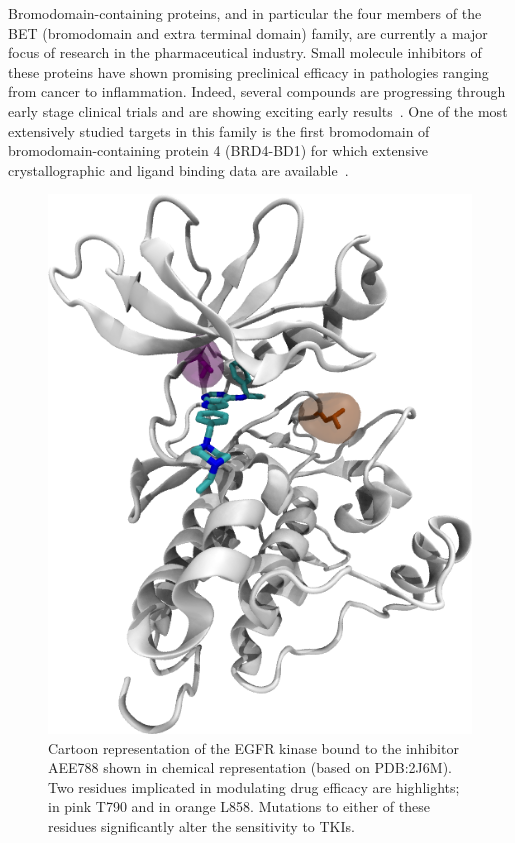 \documentclass[conference]{IEEEtran}
\begin{document}


Bromodomain-containing proteins, and in particular the four members of the BET
(bromodomain and extra terminal domain) family, are currently a major focus of
research in the pharmaceutical industry. Small molecule inhibitors of these
proteins have shown promising preclinical efficacy in pathologies ranging from
cancer to inflammation. Indeed, several compounds are progressing through
early stage clinical trials and are showing exciting early
results~\cite{Theodoulou2016}. One of the most extensively studied targets in
this family is the first bromodomain of bromodomain-containing protein 4
(BRD4-BD1) for which extensive crystallographic and ligand binding data are
available~\cite{Bamborough2012}.

\begin{figure}
  \centering
  \includegraphics[width=0.60\columnwidth]{./egfr.png}
  \caption{Cartoon representation of the EGFR kinase bound to the inhibitor
  AEE788 shown in chemical representation (based on PDB:2J6M). Two residues
  implicated in modulating drug efficacy are highlights; in pink T790 and in
  orange L858. Mutations to either of these residues significantly alter the
  sensitivity to TKIs.}\label{fig:egfr}
\end{figure}
\end{document}
